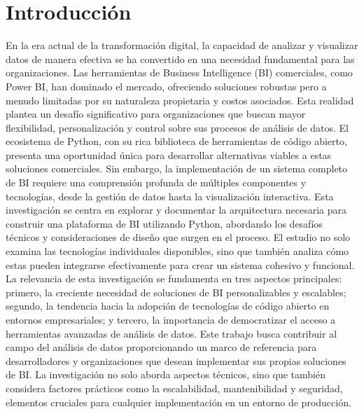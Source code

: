 \section{Introducción}
\noindent
\justifying
En la era actual de la transformación digital, la capacidad de analizar y visualizar datos de manera efectiva se ha convertido en una necesidad fundamental para las organizaciones. Las herramientas de Business Intelligence (BI) comerciales, como Power BI, han dominado el mercado, ofreciendo soluciones robustas pero a menudo limitadas por su naturaleza propietaria y costos asociados. Esta realidad plantea un desafío significativo para organizaciones que buscan mayor flexibilidad, personalización y control sobre sus procesos de análisis de datos.
El ecosistema de Python, con su rica biblioteca de herramientas de código abierto, presenta una oportunidad única para desarrollar alternativas viables a estas soluciones comerciales. Sin embargo, la implementación de un sistema completo de BI requiere una comprensión profunda de múltiples componentes y tecnologías, desde la gestión de datos hasta la visualización interactiva.
Esta investigación se centra en explorar y documentar la arquitectura necesaria para construir una plataforma de BI utilizando Python, abordando los desafíos técnicos y consideraciones de diseño que surgen en el proceso. El estudio no solo examina las tecnologías individuales disponibles, sino que también analiza cómo estas pueden integrarse efectivamente para crear un sistema cohesivo y funcional.
La relevancia de esta investigación se fundamenta en tres aspectos principales: primero, la creciente necesidad de soluciones de BI personalizables y escalables; segundo, la tendencia hacia la adopción de tecnologías de código abierto en entornos empresariales; y tercero, la importancia de democratizar el acceso a herramientas avanzadas de análisis de datos.
Este trabajo busca contribuir al campo del análisis de datos proporcionando un marco de referencia para desarrolladores y organizaciones que desean implementar sus propias soluciones de BI. La investigación no solo aborda aspectos técnicos, sino que también considera factores prácticos como la escalabilidad, mantenibilidad y seguridad, elementos cruciales para cualquier implementación en un entorno de producción.